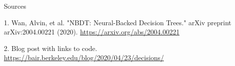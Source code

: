 \documentclass{beamer}
\begin{document}
\begin{frame}{Sources}

\begin{thebibliography}{0}

   1. Wan, Alvin, et al. "NBDT: Neural-Backed Decision Trees." arXiv preprint arXiv:2004.00221 (2020). \url{https://arxiv.org/abs/2004.00221} 
  
   2. Blog post with links to code. \url{https://bair.berkeley.edu/blog/2020/04/23/decisions/}
  
\end{thebibliography}

\end{frame}

 
\end{document}
